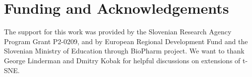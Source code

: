 \documentclass{bioinfo}
\begin{document}
\section*{Funding and Acknowledgements}
The support for this work was provided by the Slovenian Research Agency Program
Grant P2-0209, and by European Regional Development Fund and the Slovenian
Ministry of Education through BioPharm project. We want to thank George
Linderman and Dmitry Kobak for helpful discussions on extensions of t-SNE.




\end{document}
